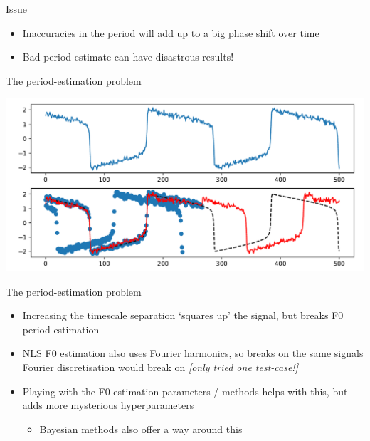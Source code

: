 \documentclass[presentation]{beamer}
\begin{document}
\begin{frame}[label={sec:org54d8611}]{Issue}
\begin{itemize}
\item Inaccuracies in the period will add up to a big phase shift over time
\item Bad period estimate can have disastrous results!
\end{itemize}
\end{frame}

\begin{frame}[label={sec:orgd838fee}]{The period-estimation problem}
\begin{center}
\includegraphics[width=.9\linewidth]{./brokenF0.pdf}
\end{center}
\end{frame}

\begin{frame}[label={sec:orgbf6bec0}]{The period-estimation problem}
\begin{itemize}
\item Increasing the timescale separation `squares up' the signal, but breaks F0 period estimation
\item NLS F0 estimation also uses Fourier harmonics, so breaks on the same signals Fourier discretisation would break on \emph{[only tried one test-case!]}
\item Playing with the F0 estimation parameters / methods helps with this, but adds more mysterious hyperparameters
\begin{itemize}
\item Bayesian methods also offer a way around this
\end{itemize}
\end{itemize}
\end{frame}
\end{document}
